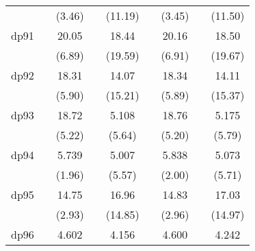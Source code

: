 {\begin{tabular}{l*{8}{c}}
            &                     &      (3.46)         &                     &     (11.19)         &                     &      (3.45)         &                     &     (11.50)         \\
[1em]
dp91        &                     &       20.05\sym{***}&                     &       18.44\sym{***}&                     &       20.16\sym{***}&                     &       18.50\sym{***}\\
            &                     &      (6.89)         &                     &     (19.59)         &                     &      (6.91)         &                     &     (19.67)         \\
[1em]
dp92        &                     &       18.31\sym{***}&                     &       14.07\sym{***}&                     &       18.34\sym{***}&                     &       14.11\sym{***}\\
            &                     &      (5.90)         &                     &     (15.21)         &                     &      (5.89)         &                     &     (15.37)         \\
[1em]
dp93        &                     &       18.72\sym{***}&                     &       5.108\sym{***}&                     &       18.76\sym{***}&                     &       5.175\sym{***}\\
            &                     &      (5.22)         &                     &      (5.64)         &                     &      (5.20)         &                     &      (5.79)         \\
[1em]
dp94        &                     &       5.739         &                     &       5.007\sym{***}&                     &       5.838\sym{*}  &                     &       5.073\sym{***}\\
            &                     &      (1.96)         &                     &      (5.57)         &                     &      (2.00)         &                     &      (5.71)         \\
[1em]
dp95        &                     &       14.75\sym{**} &                     &       16.96\sym{***}&                     &       14.83\sym{**} &                     &       17.03\sym{***}\\
            &                     &      (2.93)         &                     &     (14.85)         &                     &      (2.96)         &                     &     (14.97)         \\
[1em]
dp96        &                     &       4.602         &                     &       4.156\sym{***}&                     &       4.600         &                     &       4.242\sym{***}\\

\end{tabular}}
